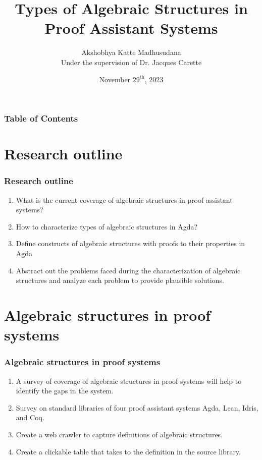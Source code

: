 \documentclass[xcolor={dvipsnames}]{beamer}
\title[Algebra in Proof Systems]{Types of Algebraic Structures in Proof Assistant Systems}
\author[Akshobhya K M]{Akshobhya Katte Madhusudana\\\small{}Under the supervision of Dr. Jacques Carette}
\institute[McMaster University]{McMaster University}
\date{November $29^{\text{th}}$, 2023}
\begin{document}
\frame{\titlepage}


\begin{frame}
\frametitle{Table of Contents}
\tableofcontents
\end{frame}

\section{Research outline}

\begin{frame}
  \frametitle{Research outline}

  \begin{enumerate}
    \item What is the current coverage of algebraic structures in proof assistant systems?
    \item How to characterize types of algebraic structures in Agda? 
    \item Define constructs of algebraic structures with proofs to their properties in Agda
    \item Abstract out the problems faced during the characterization of
    algebraic structures and analyze each problem to provide plausible
    solutions.    
  \end{enumerate}
\end{frame}

\section{Algebraic structures in proof systems}

\begin{frame}
  \frametitle{Algebraic structures in proof systems}
  \begin{enumerate}
    \item A survey of coverage of algebraic structures in proof systems will
    help to identify the gaps in the system.
    \item Survey on standard libraries of four proof assistant systems Agda, Lean, Idris, and Coq.
    \item Create a web crawler to capture definitions of algebraic structures.
    \item Create a clickable table that takes to the definition in the source library.
  \end{enumerate}

\end{frame}
\end{document}
